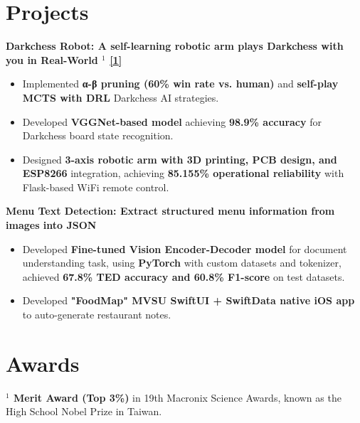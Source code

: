 \documentclass[a4paper,11pt]{article}
\begin{document}
\section{Projects}
\noindent \textbf{Darkchess Robot: A self-learning robotic arm plays Darkchess with you in Real-World \href{https://github.com/ryanlinjui/darkchess-robot}{\color{textcolor}\raisebox{0pt}{}} \hyperlink{award1}{\color{textcolor}\raisebox{0pt}{}$^{1}$} \hyperlink{patent1}{\color{textcolor}[1]}}
\begin{itemize}
    \item Implemented \textbf{α-β pruning (60\% win rate vs. human)} and \textbf{self-play MCTS with DRL} Darkchess AI strategies.
    \item Developed \textbf{VGGNet-based model} achieving \textbf{98.9\% accuracy} for Darkchess board state recognition.
    \item Designed \textbf{3-axis robotic arm with 3D printing, PCB design, and ESP8266} integration, achieving \textbf{85.155\% operational reliability} with Flask-based WiFi remote control.
\end{itemize}

\vspace{0.25em}

\noindent \textbf{Menu Text Detection: Extract structured menu information from images into JSON} \href{https://github.com/ryanlinjui/menu-text-detection}{\color{textcolor}\raisebox{0pt}{}}
\begin{itemize}
    \item Developed \textbf{Fine-tuned Vision Encoder-Decoder model} for document understanding task, using \textbf{PyTorch} with custom datasets and tokenizer, achieved \textbf{67.8\% TED accuracy and 60.8\% F1-score} on test datasets.
    \item Developed \textbf{"FoodMap" \href{https://github.com/ryanlinjui/FoodMap}{\color{textcolor}\raisebox{0pt}{}} MVSU SwiftUI + SwiftData native iOS app} to auto-generate restaurant notes.
\end{itemize}

\section{Awards}
\noindent \hypertarget{award1}{\label{award1}} \textbf{\raisebox{0pt}{}$^{1}$ Merit Award (Top 3\%)} in 19th Macronix Science Awards, known as the High School Nobel Prize in Taiwan.
\end{document}
